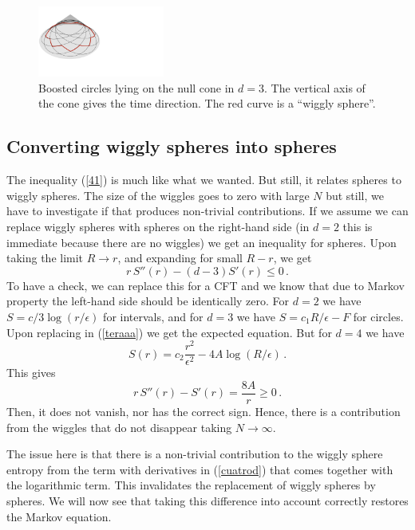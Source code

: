 \documentclass[12pt]{article}
\numberwithin{equation}{section}
\newcommand{\be}{\begin{equation}}
\newcommand{\ee}{\end{equation}}
\begin{document}
\begin{figure}[t]
\begin{center}
\includegraphics[width=0.37\textwidth]{boosted.pdf} 
\caption{Boosted circles lying on the null cone in $d=3$. The vertical axis of the cone gives the time direction. The red curve is a ``wiggly sphere''. }
\label{boosted}
\end{center}
\end{figure}

\subsection{Converting wiggly spheres into spheres}

The inequality (\ref{41}) is much like what we wanted. But still, it relates spheres to wiggly spheres. The size of the wiggles goes to zero with large $N$ but still, we have to investigate if that produces non-trivial contributions. If we assume we can replace wiggly spheres with spheres on the right-hand side (in $d=2$ this is immediate because there are no wiggles) we get an inequality for spheres. Upon taking the limit $R\rightarrow r$, and expanding for small $R-r$, we get
\be
r\, S''(r) -(d-3) S'(r)\le 0\,. \label{teraaa}
\ee
To have a check, we can replace this for a CFT and we know that due to Markov property the left-hand side should be identically zero. For $d=2$ we have $S=c/3 \log (r/\epsilon)$ for intervals, and for $d=3$ we have $S= c_1 R/\epsilon-F$ for circles. Upon replacing in (\ref{teraaa}) we get the expected equation. But for $d=4$ we have 
\be
S(r)=c_2 \frac{r^2}{\epsilon^2}-4 A \log(R/\epsilon)\,.
\ee
 This gives
\be
r\, S''(r) - S'(r)=\frac{8A}{r}\ge 0 \,.
\ee
Then, it does not vanish, nor has the correct sign. Hence, there is a contribution from the wiggles that do not disappear taking $N\rightarrow \infty$. 

The issue here is that there is a non-trivial contribution to the wiggly sphere entropy from the term with derivatives in (\ref{cuatrod}) that comes together with the logarithmic term. This invalidates the replacement of wiggly spheres by spheres. We will now see that taking this difference into account correctly restores the Markov equation.
\end{document}
